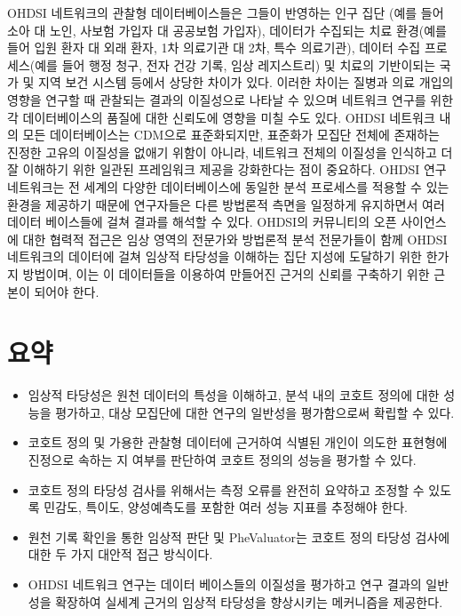 \documentclass[11pt]{book}
\providecommand{\tightlist}{%
  \setlength{\itemsep}{0pt}\setlength{\parskip}{0pt}}
\theoremstyle{definition}
\theoremstyle{definition}
\theoremstyle{definition}
\theoremstyle{remark}
\let\BeginKnitrBlock\begin \let\EndKnitrBlock\end
\begin{document}
OHDSI 네트워크의 관찰형 데이터베이스들은 그들이 반영하는 인구 집단 (예를
들어 소아 대 노인, 사보험 가입자 대 공공보험 가입자), 데이터가 수집되는
치료 환경(예를 들어 입원 환자 대 외래 환자, 1차 의료기관 대 2차, 특수
의료기관), 데이터 수집 프로세스(예를 들어 행정 청구, 전자 건강 기록,
임상 레지스트리) 및 치료의 기반이되는 국가 및 지역 보건 시스템 등에서
상당한 차이가 있다. 이러한 차이는 질병과 의료 개입의 영향을 연구할 때
관찰되는 결과의 이질성으로 나타날 수 있으며 네트워크 연구를 위한 각
데이터베이스의 품질에 대한 신뢰도에 영향을 미칠 수도 있다. OHDSI
네트워크 내의 모든 데이터베이스는 CDM으로 표준화되지만, 표준화가 모집단
전체에 존재하는 진정한 고유의 이질성을 없애기 위함이 아니라, 네트워크
전체의 이질성을 인식하고 더 잘 이해하기 위한 일관된 프레임워크 제공을
강화한다는 점이 중요하다. OHDSI 연구 네트워크는 전 세계의 다양한
데이터베이스에 동일한 분석 프로세스를 적용할 수 있는 환경을 제공하기
때문에 연구자들은 다른 방법론적 측면을 일정하게 유지하면서 여러 데이터
베이스들에 걸쳐 결과를 해석할 수 있다. OHDSI의 커뮤니티의 오픈
사이언스에 대한 협력적 접근은 임상 영역의 전문가와 방법론적 분석
전문가들이 함께 OHDSI 네트워크의 데이터에 걸쳐 임상적 타당성을 이해하는
집단 지성에 도달하기 위한 한가지 방법이며, 이는 이 데이터들을 이용하여
만들어진 근거의 신뢰를 구축하기 위한 근본이 되어야 한다.

\section{요약}\label{-14}

\BeginKnitrBlock{rmdsummary}
\begin{itemize}
\tightlist
\item
  임상적 타당성은 원천 데이터의 특성을 이해하고, 분석 내의 코호트 정의에
  대한 성능을 평가하고, 대상 모집단에 대한 연구의 일반성을 평가함으로써
  확립할 수 있다.
\item
  코호트 정의 및 가용한 관찰형 데이터에 근거하여 식별된 개인이 의도한
  표현형에 진정으로 속하는 지 여부를 판단하여 코호트 정의의 성능을
  평가할 수 있다.
\item
  코호트 정의 타당성 검사를 위해서는 측정 오류를 완전히 요약하고 조정할
  수 있도록 민감도, 특이도, 양성예측도를 포함한 여러 성능 지표를
  추정해야 한다.
\item
  원천 기록 확인을 통한 임상적 판단 및 PheValuator는 코호트 정의 타당성
  검사에 대한 두 가지 대안적 접근 방식이다.
\item
  OHDSI 네트워크 연구는 데이터 베이스들의 이질성을 평가하고 연구 결과의
  일반성을 확장하여 실세계 근거의 임상적 타당성을 향상시키는 메커니즘을
  제공한다.
\end{itemize}
\EndKnitrBlock{rmdsummary}
\end{document}
